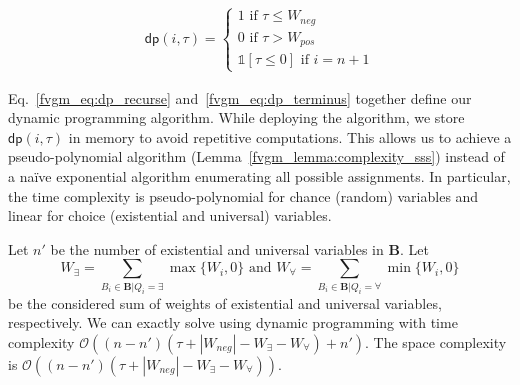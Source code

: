 \begin{align}\label{fvgm_eq:dp_terminus}
 \mathsf{dp}(i, \tau) =
 \begin{cases}
 1\text{ if }\tau \le W_{neg}\\
 0\text{ if } \tau > W_{pos}\\
 \mathds{1}[\tau \le 0] \text{ if } i=n + 1
 \end{cases} 
\end{align}

Eq.~\eqref{fvgm_eq:dp_recurse} and~\eqref{fvgm_eq:dp_terminus} together define our dynamic programming algorithm. While deploying the algorithm, we store $ \mathsf{dp}(i, \tau) $ in memory to avoid repetitive computations.  This allows us to achieve a pseudo-polynomial algorithm (Lemma~\ref{fvgm_lemma:complexity_sss}) instead of a na\"ive exponential algorithm enumerating all possible assignments. In particular, the time complexity is pseudo-polynomial for chance (random) variables and linear for choice (existential and universal) variables.
 
\begin{lemma}\label{fvgm_lemma:complexity_sss}
 	Let $ n' $ be the number of existential and universal variables in $ \mathbf{B} $. Let $$ W_{\exists} = \sum_{B_i \in \mathbf{B} | Q_i = \exists} \max\{W_i, 0\}\text{ and } W_{\forall} = \sum_{B_i \in \mathbf{B} | Q_i = \forall} \min\{W_i, 0\} $$ be the considered sum of weights of existential and universal variables, respectively. We can exactly solve {\stochastic} using dynamic programming with time complexity $ \mathcal{O}((n - n')(\tau + |W_{neg}| - W_{\exists} - W_{\forall}) + n') $. The space complexity is  $ \mathcal{O}((n - n')(\tau + |W_{neg}| - W_{\exists} - W_{\forall})) $.
\end{lemma}


